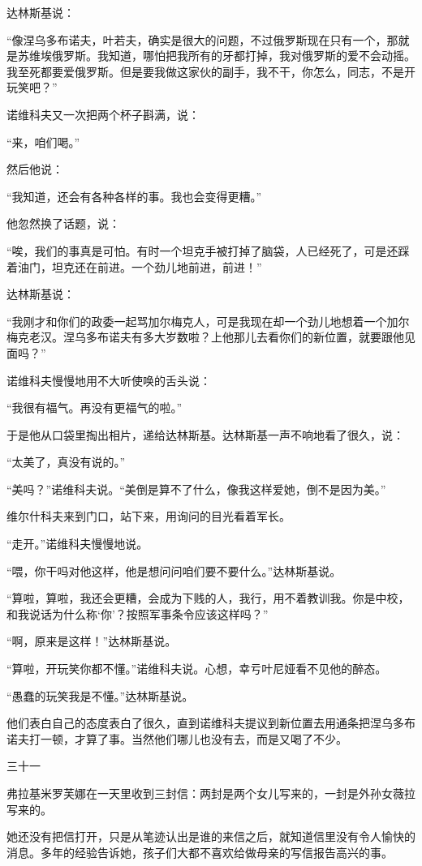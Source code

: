 达林斯基说：

“像涅乌多布诺夫，叶若夫，确实是很大的问题，不过俄罗斯现在只有一个，那就是苏维埃俄罗斯。我知道，哪怕把我所有的牙都打掉，我对俄罗斯的爱不会动摇。我至死都要爱俄罗斯。但是要我做这家伙的副手，我不干，你怎么，同志，不是开玩笑吧？”

诺维科夫又一次把两个杯子斟满，说：

“来，咱们喝。”

然后他说：

“我知道，还会有各种各样的事。我也会变得更糟。”

他忽然换了话题，说：

“唉，我们的事真是可怕。有时一个坦克手被打掉了脑袋，人已经死了，可是还踩着油门，坦克还在前进。一个劲儿地前进，前进！”

达林斯基说：

“我刚才和你们的政委一起骂加尔梅克人，可是我现在却一个劲儿地想着一个加尔梅克老汉。涅乌多布诺夫有多大岁数啦？上他那儿去看你们的新位置，就要跟他见面吗？”

诺维科夫慢慢地用不大听使唤的舌头说：

“我很有福气。再没有更福气的啦。”

于是他从口袋里掏出相片，递给达林斯基。达林斯基一声不响地看了很久，说：

“太美了，真没有说的。”

“美吗？”诺维科夫说。“美倒是算不了什么，像我这样爱她，倒不是因为美。”

维尔什科夫来到门口，站下来，用询问的目光看着军长。

“走开。”诺维科夫慢慢地说。

“喂，你干吗对他这样，他是想问问咱们要不要什么。”达林斯基说。

“算啦，算啦，我还会更糟，会成为下贱的人，我行，用不着教训我。你是中校，和我说话为什么称‘你’？按照军事条令应该这样吗？”

“啊，原来是这样！”达林斯基说。

“算啦，开玩笑你都不懂。”诺维科夫说。心想，幸亏叶尼娅看不见他的醉态。

“愚蠢的玩笑我是不懂。”达林斯基说。

他们表白自己的态度表白了很久，直到诺维科夫提议到新位置去用通条把涅乌多布诺夫打一顿，才算了事。当然他们哪儿也没有去，而是又喝了不少。

三十一

弗拉基米罗芙娜在一天里收到三封信：两封是两个女儿写来的，一封是外孙女薇拉写来的。

她还没有把信打开，只是从笔迹认出是谁的来信之后，就知道信里没有令人愉快的消息。多年的经验告诉她，孩子们大都不喜欢给做母亲的写信报告高兴的事。

